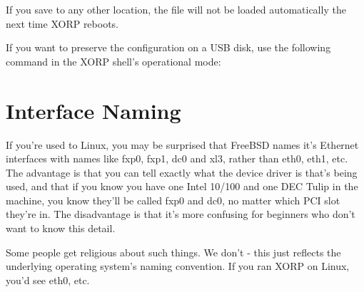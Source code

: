\vspace{0.1in}
\noindent{}
\vspace{0.1in}

If you save to any other location, the file will not be loaded automatically the next time XORP reboots.

If you want to preserve the configuration on a USB disk, use the following
command in the XORP shell's operational mode:

\vspace{0.1in}
\noindent{}
\vspace{0.1in}


\section{Interface Naming}

If you're used to Linux, you may be surprised that FreeBSD names it's
Ethernet interfaces with names like {\stt fxp0}, {\stt fxp1},
{\stt dc0} and {\stt xl3}, rather than {\stt eth0}, {\stt eth1}, etc.
The advantage is that you can tell exactly what the device driver is
that's being used, and that if you know you have one Intel 10/100 and one
DEC Tulip in the machine, you know they'll be called {\stt fxp0} and
{\stt dc0}, no matter which PCI slot they're in.  The disadvantage is
that it's more confusing for beginners who don't want to know this detail.

Some people get religious about such things.  We don't - this just
reflects the underlying operating system's naming convention.  If you
ran XORP on Linux, you'd see {\stt eth0}, etc.
